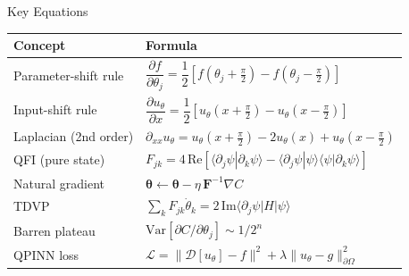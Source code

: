 \documentclass[aspectratio=169,11pt]{beamer}
\newcommand{\btheta}{\boldsymbol{\theta}}
\newcommand{\QFI}{\mathbf{F}}
\newcommand{\Variance}{\mathrm{Var}}
\begin{document}
\begin{frame}{Key Equations}
  \small
  \begin{center}
  \begin{tabular}{ll}
    \toprule
    \textbf{Concept} & \textbf{Formula} \\
    \midrule
    Parameter-shift rule &
      $\dfrac{\partial f}{\partial\theta_j}
       = \dfrac{1}{2}[f(\theta_j{+}\tfrac\pi2)
                     -f(\theta_j{-}\tfrac\pi2)]$ \\[7pt]
    Input-shift rule &
      $\dfrac{\partial u_\theta}{\partial x}
       = \dfrac{1}{2}[u_\theta(x{+}\tfrac\pi2)
                     -u_\theta(x{-}\tfrac\pi2)]$ \\[7pt]
    Laplacian (2nd order) &
      $\partial_{xx}u_\theta
       = u_\theta(x{+}\tfrac\pi2)
         - 2u_\theta(x)
         + u_\theta(x{-}\tfrac\pi2)$ \\[7pt]
    QFI (pure state) &
      $F_{jk} = 4\,\mathrm{Re}[
        \langle\partial_j\psi|\partial_k\psi\rangle
       -\langle\partial_j\psi|\psi\rangle
        \langle\psi|\partial_k\psi\rangle]$ \\[7pt]
    Natural gradient &
      $\btheta\leftarrow\btheta-\eta\,\QFI^{-1}\nabla C$ \\[7pt]
    TDVP &
      $\sum_k F_{jk}\dot{\theta}_k
       = 2\,\mathrm{Im}\langle\partial_j\psi|H|\psi\rangle$ \\[7pt]
    Barren plateau &
      $\Variance[\partial C/\partial\theta_j]\sim 1/2^n$ \\[7pt]
    QPINN loss &
      $\mathcal{L} = \|\mathcal{D}[u_\theta]-f\|^2
                    + \lambda\|u_\theta-g\|^2_{\partial\Omega}$ \\
    \bottomrule
  \end{tabular}
  \end{center}
\end{frame}
\end{document}
